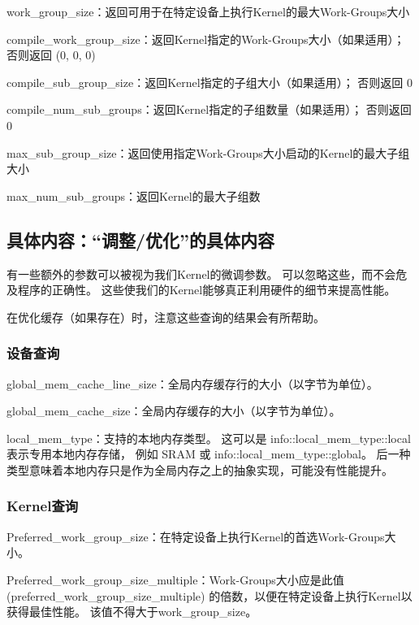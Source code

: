 work\_group\_size：返回可用于在特定设备上执行Kernel的最大Work-Groups大小

compile\_work\_group\_size：返回Kernel指定的Work-Groups大小（如果适用）； 否则返回 (0, 0, 0)

compile\_sub\_group\_size：返回Kernel指定的子组大小（如果适用）； 否则返回 0

compile\_num\_sub\_groups：返回Kernel指定的子组数量（如果适用）； 否则返回 0

max\_sub\_group\_size：返回使用指定Work-Groups大小启动的Kernel的最大子组大小

max\_num\_sub\_groups：返回Kernel的最大子组数

\subsection{具体内容：“调整/优化”的具体内容}
有一些额外的参数可以被视为我们Kernel的微调参数。 
可以忽略这些，而不会危及程序的正确性。 这些使我们的Kernel能够真正利用硬件的细节来提高性能。

\begin{remark}
	在优化缓存（如果存在）时，注意这些查询的结果会有所帮助。
\end{remark}

\subsubsection{设备查询}
global\_mem\_cache\_line\_size：全局内存缓存行的大小（以字节为单位）。

global\_mem\_cache\_size：全局内存缓存的大小（以字节为单位）。 

local\_mem\_type：支持的本地内存类型。 这可以是 info::local\_mem\_type::local 表示专用本地内存存储，
例如 SRAM 或 info::local\_mem\_type::global。 
后一种类型意味着本地内存只是作为全局内存之上的抽象实现，可能没有性能提升。

\subsubsection{Kernel查询}
Preferred\_work\_group\_size：在特定设备上执行Kernel的首选Work-Groups大小。

Preferred\_work\_group\_size\_multiple：Work-Groups大小应是此值 (preferred\_work\_group\_size\_multiple) 的倍数，以便在特定设备上执行Kernel以获得最佳性能。 
该值不得大于work\_group\_size。

